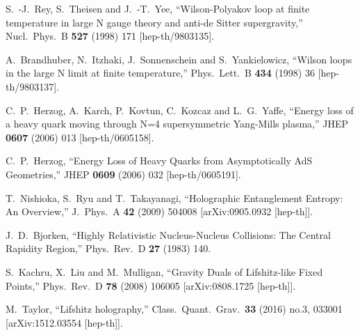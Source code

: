 \begin{thebibliography}{99}

%
%

  S.~-J.~Rey, S.~Theisen and J.~-T.~Yee,
  ``Wilson-Polyakov loop at finite temperature in large N gauge theory and anti-de Sitter supergravity,''
  Nucl.\ Phys.\ B {\bf 527} (1998) 171
  [hep-th/9803135].

  A.~Brandhuber, N.~Itzhaki, J.~Sonnenschein and S.~Yankielowicz,
  ``Wilson loops in the large N limit at finite temperature,''
  Phys.\ Lett.\ B {\bf 434} (1998) 36
  [hep-th/9803137].
  
  C.~P.~Herzog, A.~Karch, P.~Kovtun, C.~Kozcaz and L.~G.~Yaffe,
  ``Energy loss of a heavy quark moving through N=4 supersymmetric Yang-Mills plasma,''
  JHEP {\bf 0607} (2006) 013
  [hep-th/0605158].

  C.~P.~Herzog,
  ``Energy Loss of Heavy Quarks from Asymptotically AdS Geometries,''
  JHEP {\bf 0609} (2006) 032
  [hep-th/0605191].

  T.~Nishioka, S.~Ryu and T.~Takayanagi,
  ``Holographic Entanglement Entropy: An Overview,''
  J.\ Phys.\ A {\bf 42} (2009) 504008
  [arXiv:0905.0932 [hep-th]].

  J.~D.~Bjorken,
  ``Highly Relativistic Nucleus-Nucleus Collisions: The Central Rapidity Region,''
  Phys.\ Rev.\ D {\bf 27} (1983) 140.
  
  S.~Kachru, X.~Liu and M.~Mulligan,
  ``Gravity Duals of Lifshitz-like Fixed Points,''
  Phys.\ Rev.\ D {\bf 78} (2008) 106005
  [arXiv:0808.1725 [hep-th]].

  M.~Taylor,
  ``Lifshitz holography,''
  Class.\ Quant.\ Grav.\  {\bf 33} (2016) no.3,  033001
  [arXiv:1512.03554 [hep-th]].
  

\end{thebibliography}
